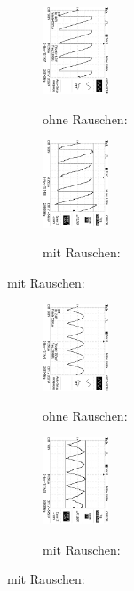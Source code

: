 \begin{figure}
\caption{$U_{out} (\phi = 270°$)}
\begin{subfigure}{0.48\textwidth}
\centering
\caption*{ohne Rauschen:}
\includegraphics[angle=90,height=2.6cm]{graphics/ALL0035/F0035TEK.jpg}
\label{fig:phi270o}
\end{subfigure}
\begin{subfigure}{0.48\textwidth}
\centering
\caption*{mit Rauschen:}
\includegraphics[angle=90,height=2.6cm]{graphics/ALL0043/F0043TEK.jpg}
\label{fig:phi270m}
\end{subfigure}
\end{figure}
\addtocounter{figure}{-1}
\begin{figure}
\caption{$U_{out} (\phi = 340°$) }
\begin{subfigure}{0.48\textwidth}
\centering
\caption*{ohne Rauschen:}
\includegraphics[angle=90,height=2.6cm]{graphics/ALL0038/F0038TEK.jpg}
\label{fig:phi340o}
\end{subfigure}
\begin{subfigure}{0.48\textwidth}
\centering
\caption*{mit Rauschen:}
\includegraphics[angle=90,height=2.6cm]{graphics/ALL0046/F0046TEK.jpg}
\label{fig:phi340m}
\end{subfigure}
\label{fig:U_out}
\end{figure}
\addtocounter{figure}{-1}

